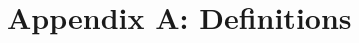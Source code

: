 \documentclass[10pt,journal]{IEEEtran}  %
\begin{document}
\section{Appendix A: Definitions}
\label{sec:appendix_a}


\end{document}
